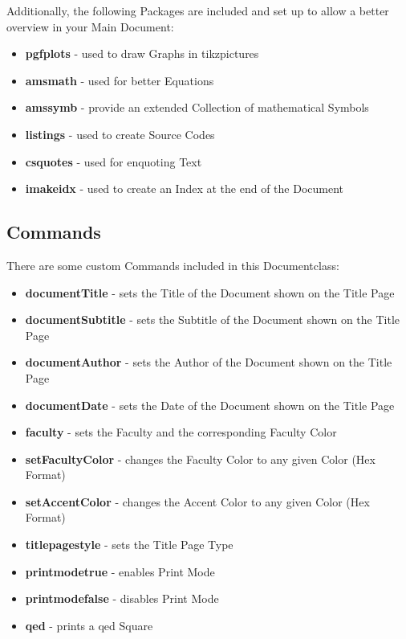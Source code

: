 \documentclass[a4paper]{../uulm-document}
\begin{document}
Additionally, the following Packages are included and set up to allow a better overview in your Main Document:
\begin{itemize}
\item \textbf{pgfplots} - used to draw Graphs in tikzpictures
\item \textbf{amsmath} - used for better Equations
\item \textbf{amssymb} - provide an extended Collection of mathematical Symbols
\item \textbf{listings} - used to create Source Codes
\item \textbf{csquotes} - used for enquoting Text
\item \textbf{imakeidx} - used to create an Index at the end of the Document
\end{itemize}

\subsection{Commands}
There are some custom Commands included in this Documentclass:
\begin{itemize}
\item \textbf{documentTitle} - sets the Title of the Document shown on the Title Page
\item \textbf{documentSubtitle} - sets the Subtitle of the Document shown on the Title Page
\item \textbf{documentAuthor} - sets the Author of the Document shown on the Title Page
\item \textbf{documentDate} - sets the Date of the Document shown on the Title Page
\item \textbf{faculty} - sets the Faculty and the corresponding Faculty Color
\item \textbf{setFacultyColor} - changes the Faculty Color to any given Color (Hex Format)
\item \textbf{setAccentColor} - changes the Accent Color to any given Color (Hex Format)
\item \textbf{titlepagestyle} - sets the Title Page Type
\item \textbf{printmodetrue} - enables Print Mode
\item \textbf{printmodefalse} - disables Print Mode
\item \textbf{qed} - prints a qed Square
\end{itemize}
\end{document}
